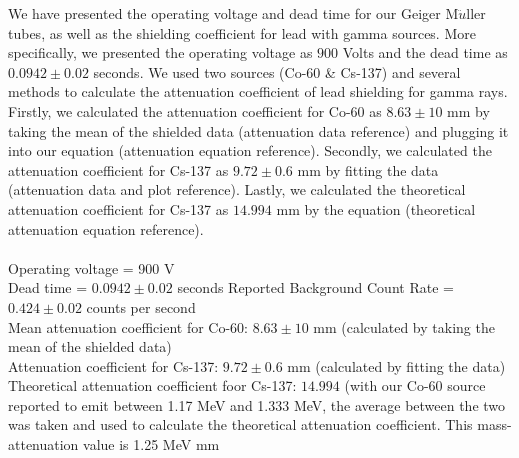 We have presented the operating voltage and dead time for our Geiger M$\ddot{u}$ller tubes, as well as the shielding coefficient for lead with gamma sources. More specifically, we presented the operating voltage as $900$ Volts and the dead time as $0.0942 \pm 0.02$ seconds. We used two sources (Co-60 \& Cs-137) and several methods to calculate the attenuation coefficient of lead shielding for gamma rays. Firstly, we calculated the attenuation coefficient for Co-60 as $8.63 \pm 10$ mm by taking the mean of the shielded data (attenuation data reference) and plugging it into our equation (attenuation equation reference). Secondly, we calculated the attenuation coefficient for Cs-137 as $9.72 \pm 0.6$ mm by fitting the data (attenuation data and plot reference). Lastly, we calculated the theoretical attenuation coefficient for Cs-137 as $14.994$ mm by the equation (theoretical attenuation equation reference).
\\ \\
Operating voltage = 900 V \\
Dead time = $0.0942 \pm 0.02$ seconds
Reported Background Count Rate  = $0.424 \pm 0.02$ counts per second \\ 
Mean attenuation coefficient for Co-60: $8.63 \pm 10$ mm (calculated by taking the mean of the shielded data) \\
Attenuation coefficient for Cs-137: $9.72 \pm 0.6$ mm (calculated by fitting the data) \\
Theoretical attenuation coefficient foor Cs-137: $14.994$ (with our Co-60 source reported to emit between 1.17 MeV and 1.333 MeV, the average between the two was taken and used to calculate the theoretical attenuation coefficient. This mass-attenuation value is 1.25 MeV mm